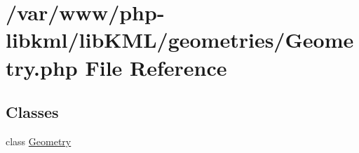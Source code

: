 \hypertarget{Geometry_8php}{
\section{/var/www/php-\/libkml/libKML/geometries/Geometry.php File Reference}
\label{db/d99/Geometry_8php}
}
\subsection*{Classes}
\begin{DoxyCompactItemize}
\item 
class \hyperlink{classGeometry}{Geometry}
\end{DoxyCompactItemize}
